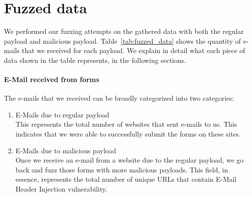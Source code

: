 \section{Fuzzed data}
We performed our fuzzing attempts on the gathered data with both the regular payload and malicious payload. Table~\ref{tab:fuzzed_data} shows the quantity of e-mails that we received for each payload. We explain in detail what each piece of data shown in the table represents, in the following sections.

\paragraph{E-Mail received from forms}
The e-mails that we received can be broadly categorized into two categories:
\begin{enumerate}
	\item E-Mails due to regular payload\\
	This represents the total number of websites that sent e-mails to us. This indicates that we were able to successfully submit the forms on these sites.
	
	\item E-Mails due to malicious payload\\
    Once we receive an e-mail from a website due to the regular payload, we go back and fuzz those forms with more malicious payloads. This field, in essence, represents the total number of unique URLs that contain E-Mail Header Injection vulnerability.
\end{enumerate}



